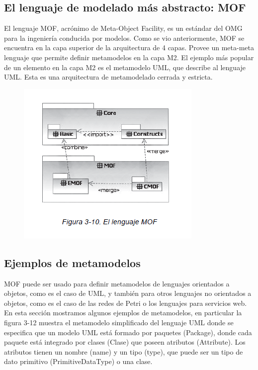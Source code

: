 \subsection{El lenguaje de modelado más abstracto: MOF}

El lenguaje MOF, acrónimo de Meta-Object Facility, es un estándar del
OMG para la ingeniería conducida por modelos. Como se vio anteriormente,
MOF se encuentra en la capa superior de la arquitectura de 4
capas. Provee un meta-meta lenguaje que permite definir metamodelos
en la capa M2. El ejemplo más popular de un elemento en la capa M2 es
el metamodelo UML, que describe al lenguaje UML.
Esta es una arquitectura de metamodelado cerrada y estricta.

\begin{figure}[H]
\centering
\includegraphics[scale=0.9]{./Imagenes/modelo16}
\end{figure}


\subsection{Ejemplos de metamodelos}

MOF puede ser usado para definir metamodelos de lenguajes orientados
a objetos, como es el caso de UML, y también para otros lenguajes
no orientados a objetos, como es el caso de las redes de Petri o los
lenguajes para servicios web.
En esta sección mostramos algunos ejemplos de metamodelos, en
particular la figura 3-12 muestra el metamodelo simplificado del lenguaje
UML donde se especifica que un modelo UML está formado por
paquetes (Package), donde cada paquete está integrado por clases
(Clase) que poseen atributos (Attribute). Los atributos tienen un nombre
(name) y un tipo (type), que puede ser un tipo de dato primitivo
(PrimitiveDataType) o una clase.

